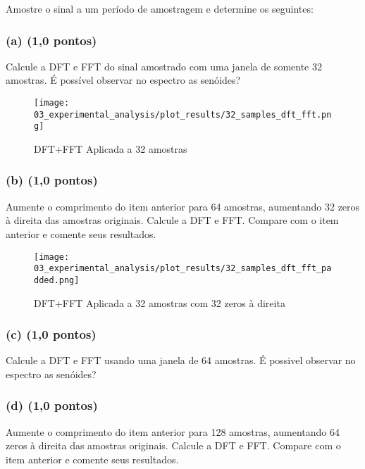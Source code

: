 Amostre o sinal  a um período de amostragem e determine os seguintes:

\subsubsection*{(a) \textbf{(1,0 pontos) }}
Calcule a DFT e FFT do sinal amostrado com uma janela de somente 32 amostras. É possível observar no espectro as senóides?

\begin{figure}[H]
    \centering
    \texttt{[image: 03\_experimental\_analysis/plot\_results/32\_samples\_dft\_fft.png]}
    \caption{DFT+FFT Aplicada a 32 amostras}
    \label{fig:signal_32samples_fft-dft}
\end{figure}

\subsubsection*{(b) \textbf{(1,0 pontos)}}
Aumente o comprimento do item anterior para 64 amostras, aumentando 32 zeros à direita das amostras originais. Calcule a DFT e FFT. Compare com o item anterior e comente seus resultados.

\begin{figure}[H]
    \centering
    \texttt{[image: 03\_experimental\_analysis/plot\_results/32\_samples\_dft\_fft\_padded.png]}
    \caption{DFT+FFT Aplicada a 32 amostras com 32 zeros à direita}
    \label{fig:signal_32samples_fft-dft_padded}
\end{figure}

\subsubsection*{(c) \textbf{(1,0 pontos)}}
Calcule a DFT e FFT usando uma janela de 64 amostras. É possivel observar no espectro as senóides?

\subsubsection*{(d) \textbf{(1,0 pontos)}}
Aumente o comprimento do item anterior para 128 amostras, aumentando 64 zeros à direita das amostras originais. Calcule a DFT e FFT. Compare com o item anterior e comente seus resultados.

